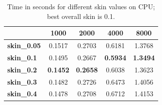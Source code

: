 \begin{table}[H]
    \centering
    \begin{tabular}{|l|c|c|c|c|}
        \hline
                            & \textbf{1000}   & \textbf{2000}   & \textbf{4000}   & \textbf{8000}   \\
        \hline
        \textbf{skin\_0.05} & 0.1517          & 0.2703          & 0.6181          & 1.3768          \\

        \textbf{skin\_0.1}  & 0.1495          & 0.2667          & \textbf{0.5934} & \textbf{1.3494} \\

        \textbf{skin\_0.2}  & \textbf{0.1452} & \textbf{0.2658} & 0.6038          & 1.3623          \\

        \textbf{skin\_0.3}  & 0.1482          & 0.2726          & 0.6473          & 1.4056          \\

        \textbf{skin\_0.4}  & 0.1478          & 0.2708          & 0.6712          & 1.4153          \\

        \hline
    \end{tabular}
    \caption{Time in seconds for different skin values on CPU; best overall skin is 0.1.}
    \label{tab:cpu-timings}
\end{table}
